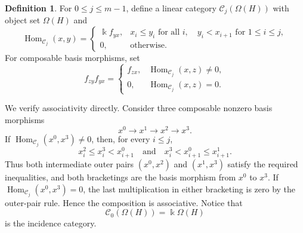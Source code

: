\documentclass[12pt,a4paper,english,reqno]{amsart}
\theoremstyle{plain}
\theoremstyle{definition}
\newtheorem{definition}[theorem]{Definition}
\newcommand{\kk}{\Bbbk}
\newcommand{\Hom}{\operatorname{Hom}}
\newcommand{\C}{\mathcal C}
\begin{document}
\begin{definition}
\label{def:Cj}
For $0\leq j\leq m-1$, define a linear category
$\C_j(\Omega(H))$ with object set $\Omega(H)$ and
\begin{equation}
 \Hom_{\C_j}(x,y)=
 \begin{cases}
 \kk f_{yx},&
 x_i\leq y_i\text{ for all }i,\quad
 y_i<x_{i+1}\text{ for }1\leq i\leq j,\\
 0,&\text{otherwise}.
 \end{cases}
\label{eq:Cj-hom}
\end{equation}
For composable basis morphisms, set
\begin{equation}
 f_{zy}f_{yx}=
 \begin{cases}
 f_{zx},&\Hom_{\C_j}(x,z)\neq0,\\
 0,&\Hom_{\C_j}(x,z)=0.
 \end{cases}
\label{eq:Cj-composition}
\end{equation}
\end{definition}

We verify associativity directly.  Consider three composable nonzero basis
morphisms
\[
 x^0\longrightarrow x^1\longrightarrow x^2\longrightarrow x^3.
\]
If $\Hom_{\C_j}(x^0,x^3)\neq0$, then, for every $i\leq j$,
\[
 x_i^2\leq x_i^3<x_{i+1}^0
 \quad\text{and}\quad
 x_i^3<x_{i+1}^0\leq x_{i+1}^1.
\]
Thus both intermediate outer pairs $(x^0,x^2)$ and $(x^1,x^3)$
satisfy the required inequalities, and both bracketings are the basis
morphism from $x^0$ to $x^3$.  If
$\Hom_{\C_j}(x^0,x^3)=0$, the last multiplication in either bracketing is
zero by the outer-pair rule.  Hence the composition is associative.  Notice
that
\[
 \C_0(\Omega(H))=\kk\Omega(H)
\]
is the incidence category.
\end{document}
